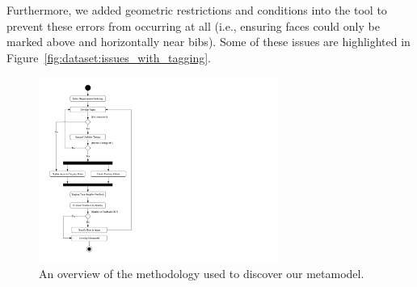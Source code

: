\noindent
Furthermore, we added geometric restrictions and conditions into the tool to prevent these errors from occurring at all (i.e., ensuring faces could only be marked above and horizontally near bibs). Some of these issues are highlighted in Figure~\ref{fig:dataset:issues_with_tagging}.

\begin{figure}[p]
  \centering
  \includegraphics[width=0.7\textwidth]{images/dataset/methodology}
  \caption[Implementation methodology]{An overview of the methodology used to discover our metamodel.}
  \label{fig:dataset:methodology}
\end{figure}


